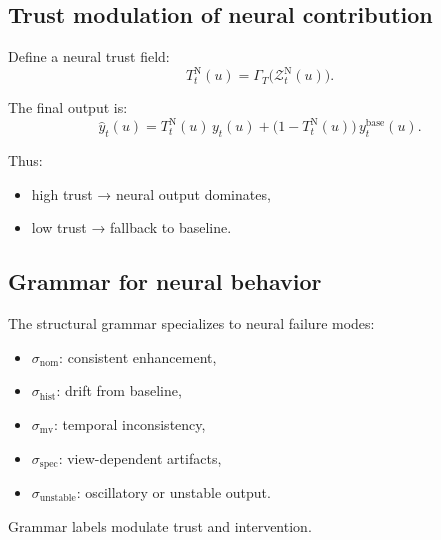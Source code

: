 \documentclass[11pt,letterpaper]{article}
\theoremstyle{gcresult}
\theoremstyle{definition}
\begin{document}

\subsection{Trust modulation of neural contribution}

Define a neural trust field:
\begin{equation}
T^{\mathrm{N}}_t(u)=\Gamma_T\!\bigl(\mathcal{Z}^{\mathrm{N}}_t(u)\bigr).
\end{equation}

The final output is:
\begin{equation}
\hat{y}_t(u)=
T^{\mathrm{N}}_t(u)\,y_t(u)
+
\bigl(1-T^{\mathrm{N}}_t(u)\bigr)\,y^{\mathrm{base}}_t(u).
\end{equation}

Thus:
\begin{itemize}[leftmargin=1.5em]
    \item high trust → neural output dominates,
    \item low trust → fallback to baseline.
\end{itemize}


\subsection{Grammar for neural behavior}

The structural grammar specializes to neural failure modes:

\begin{itemize}[leftmargin=1.5em]
    \item $\sigma_{\mathrm{nom}}$: consistent enhancement,
    \item $\sigma_{\mathrm{hist}}$: drift from baseline,
    \item $\sigma_{\mathrm{mv}}$: temporal inconsistency,
    \item $\sigma_{\mathrm{spec}}$: view-dependent artifacts,
    \item $\sigma_{\mathrm{unstable}}$: oscillatory or unstable output.
\end{itemize}

Grammar labels modulate trust and intervention.

\end{document}
